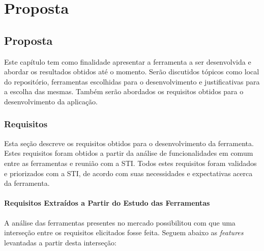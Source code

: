 \part{Proposta}

\chapter[Proposta]{Proposta}

Este capítulo tem como finalidade apresentar a ferramenta a ser desenvolvida e abordar os resultados obtidos até o momento. Serão discutidos tópicos como local do repositório, ferramentas escolhidas para o desenvolvimento e justificativas para a escolha das mesmas. Também serão abordados os requisitos obtidos para o desenvolvimento da aplicação.

\section{Requisitos}

Esta seção descreve os requisitos obtidos para o desenvolvimento da ferramenta. Estes requisitos foram obtidos a partir da análise de funcionalidades em comum entre as ferramentas e reunião com a STI. Todos estes requisitos foram validados e priorizados com a STI, de acordo com suas necessidades e expectativas acerca da ferramenta.

\subsection{Requisitos Extraídos a Partir do Estudo das Ferramentas}

A análise das ferramentas presentes no mercado possibilitou com que uma interseção entre os requisitos elicitados fosse feita. Seguem abaixo as \textit{features} levantadas a partir desta interseção:

